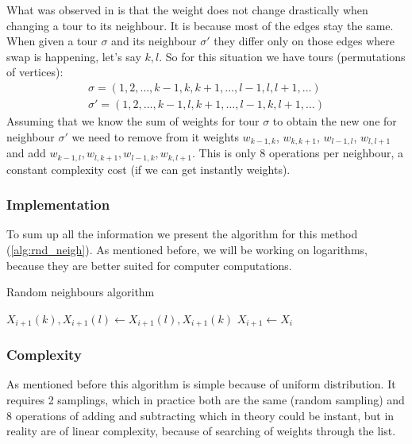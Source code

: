 		What was observed in \cite{decryption_tsp_MCMC} is that the weight does not change drastically when changing a tour to its neighbour. It is because most of the edges stay the same. When given a tour $\sigma$ and its neighbour $\sigma'$ they differ only on those edges where swap is happening, let's say $k,l$. So for this situation we have tours (permutations of vertices):
		\begin{align*}
			\sigma = (1, 2, \ldots, k-1, k, k+1, \ldots, l-1, l, l+1, \ldots) \\
			\sigma' = (1, 2, \ldots, k-1, l, k+1, \ldots, l-1, k, l+1, \ldots)
		\end{align*}
		Assuming that we know the sum of weights for tour $\sigma$ to obtain the new one for neighbour $\sigma'$ we need to remove from it weights $w_{k-1, k}$, $w_{k, k+1}$, $w_{l-1, l}$, $w_{l, l+1}$ and add $w_{k-1, l}, w_{l, k+1}, w_{l-1, k}, w_{k, l+1}$. This is only $8$ operations per neighbour, a constant complexity cost (if we can get instantly weights).
		
	\subsubsection{Implementation}
		To sum up all the information we present the algorithm for this method (\ref{alg:rnd_neigh}). As mentioned before, we will be working on logarithms, because they are better suited for computer computations.
		
		\begin{algorithm}
			\caption{Random neighbours algorithm}\label{alg:rnd_neigh}
			\begin{algorithmic}[1]
				
				\State $X_{i+1}(k), X_{i+1}(l) \gets X_{i+1}(l), X_{i+1}(k)$
				\Else
				\State $X_{i+1} \gets X_i$
				\EndIf
				\EndFor
			\end{algorithmic}
		\end{algorithm}
	
	\subsubsection{Complexity}
		As mentioned before this algorithm is simple because of uniform distribution. It requires 2 samplings, which in practice both are the same (random sampling) and 8 operations of adding and subtracting which in theory could be instant, but in reality are of linear complexity, because of searching of weights through the list.
		
